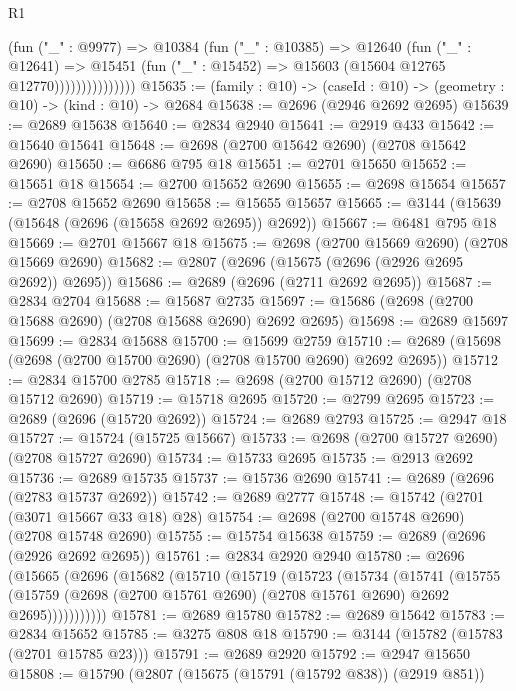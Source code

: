 \begin{lexlean}{R1}
\begin{coremodule}
                        (fun ("_" : @9977) =>
                        @10384
                          (fun ("_" : @10385) =>
                          @12640
                            (fun ("_" : @12641) =>
                            @15451
                              (fun ("_" : @15452) => @15603 (@15604 @12765 @12770)))))))))))))))
@15635 := (family : @10) -> (caseId : @10) -> (geometry : @10) -> (kind : @10) -> @2684
@15638 := @2696 (@2946 @2692 @2695)
@15639 := @2689 @15638
@15640 := @2834 @2940
@15641 := @2919 @433
@15642 := @15640 @15641
@15648 := @2698 (@2700 @15642 @2690) (@2708 @15642 @2690)
@15650 := @6686 @795 @18
@15651 := @2701 @15650
@15652 := @15651 @18
@15654 := @2700 @15652 @2690
@15655 := @2698 @15654
@15657 := @2708 @15652 @2690
@15658 := @15655 @15657
@15665 := @3144 (@15639 (@15648 (@2696 (@15658 @2692 @2695)) @2692))
@15667 := @6481 @795 @18
@15669 := @2701 @15667 @18
@15675 := @2698 (@2700 @15669 @2690) (@2708 @15669 @2690)
@15682 := @2807 (@2696 (@15675 (@2696 (@2926 @2695 @2692)) @2695))
@15686 := @2689 (@2696 (@2711 @2692 @2695))
@15687 := @2834 @2704
@15688 := @15687 @2735
@15697 := @15686 (@2698 (@2700 @15688 @2690) (@2708 @15688 @2690) @2692 @2695)
@15698 := @2689 @15697
@15699 := @2834 @15688
@15700 := @15699 @2759
@15710 := @2689 (@15698 (@2698 (@2700 @15700 @2690) (@2708 @15700 @2690) @2692 @2695))
@15712 := @2834 @15700 @2785
@15718 := @2698 (@2700 @15712 @2690) (@2708 @15712 @2690)
@15719 := @15718 @2695
@15720 := @2799 @2695
@15723 := @2689 (@2696 (@15720 @2692))
@15724 := @2689 @2793
@15725 := @2947 @18
@15727 := @15724 (@15725 @15667)
@15733 := @2698 (@2700 @15727 @2690) (@2708 @15727 @2690)
@15734 := @15733 @2695
@15735 := @2913 @2692
@15736 := @2689 @15735
@15737 := @15736 @2690
@15741 := @2689 (@2696 (@2783 @15737 @2692))
@15742 := @2689 @2777
@15748 := @15742 (@2701 (@3071 @15667 @33 @18) @28)
@15754 := @2698 (@2700 @15748 @2690) (@2708 @15748 @2690)
@15755 := @15754 @15638
@15759 := @2689 (@2696 (@2926 @2692 @2695))
@15761 := @2834 @2920 @2940
@15780 := @2696
    (@15665
      (@2696
        (@15682
          (@15710
            (@15719
              (@15723
                (@15734
                  (@15741
                    (@15755
                      (@15759
                        (@2698 (@2700 @15761 @2690) (@2708 @15761 @2690) @2692 @2695)))))))))))
@15781 := @2689 @15780
@15782 := @2689 @15642
@15783 := @2834 @15652
@15785 := @3275 @808 @18
@15790 := @3144 (@15782 (@15783 (@2701 @15785 @23)))
@15791 := @2689 @2920
@15792 := @2947 @15650
@15808 := @15790
    (@2807
      (@15675 (@15791 (@15792 @838)) (@2919 @851))

\end{coremodule}
\end{lexlean}
